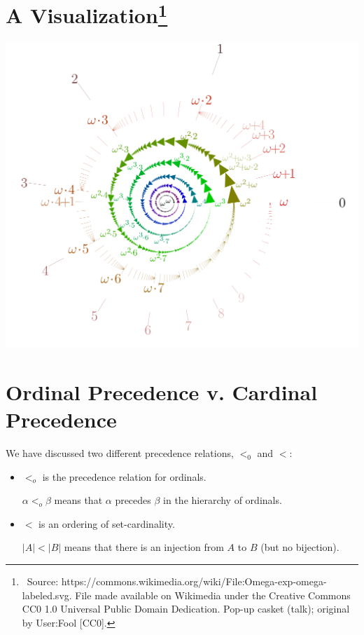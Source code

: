 \documentclass[12pt]{extarticle}
\begin{document}
\section{A Visualization\footnote{\ Source: https://commons.wikimedia.org/wiki/File:Omega-exp-omega-labeled.svg.  File made available on Wikimedia under the Creative Commons CC0 1.0 Universal Public Domain Dedication. Pop-up casket (talk); original by User:Fool [CC0].}}

\vspace{-3mm}
\hspace{4mm}
\includegraphics[scale=.49]{Omega_color.png}




\clearpage

\section{Ordinal Precedence v. Cardinal Precedence}

We have discussed two different precedence relations, $<_0$ and $<$:

\begin{itemize}
\item $<_o$ is the precedence relation for ordinals. 

$\alpha <_o \beta$ means that $\alpha$ precedes $\beta$ in the hierarchy of ordinals.

\item $<$ is an ordering of set-cardinality. 

$|A| < |B|$ means that there is an injection from $A$ to $B$ (but no bijection).

\end{itemize}
\end{document}

